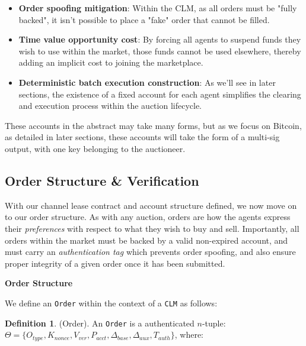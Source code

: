 \documentclass[10pt,a4paper]{article}
\theoremstyle{definition}
\newtheorem{definition}{Definition}[section]
\begin{document}
\begin{itemize} %
    \item \textbf{Order spoofing mitigation}: Within the CLM, as all orders
        must be "fully backed", it isn't possible to place a "fake" order that
        cannot be filled.

    \item \textbf{Time value opportunity cost}: By forcing all agents to
        suspend funds they wish to use within the market, those funds cannot be
        used elsewhere, thereby adding an implicit cost to joining the
        marketplace.

    \item \textbf{Deterministic batch execution construction}: As we'll see in
        later sections, the existence of a fixed account for each agent
        simplifies the clearing and execution process within the auction
        lifecycle. 

\end{itemize}

These accounts in the abstract may take many forms, but as we focus on Bitcoin,
as detailed in later sections, these accounts will take the form of a multi-sig
output, with one key belonging to the auctioneer.


\subsection{Order Structure \& Verification}

With our channel lease contract and account structure defined, we now move on
to our order structure. As with any auction, orders are how the agents express
their \emph{preferences} with respect to what they wish to buy and sell.
Importantly, all orders within the market must be backed by a valid non-expired
account, and must carry an \emph{authentication tag} which prevents order
spoofing, and also ensure proper integrity of a given order once it has been
submitted.

\begin{center}
\textbf{Order Structure}
\end{center}

We define an \texttt{Order} within the context of a \texttt{CLM} as follows:

\theoremstyle{definition}
\begin{definition}{(Order).}
    An \texttt{Order} is a authenticated $n$-tuple: \\ $\Theta = \{O_{type}, K_{nonce},
    V_{ver}, P_{acct}, \Delta_{base}, \Delta_{aux}, T_{auth} \} $, where:

\end{definition}
\end{document}
